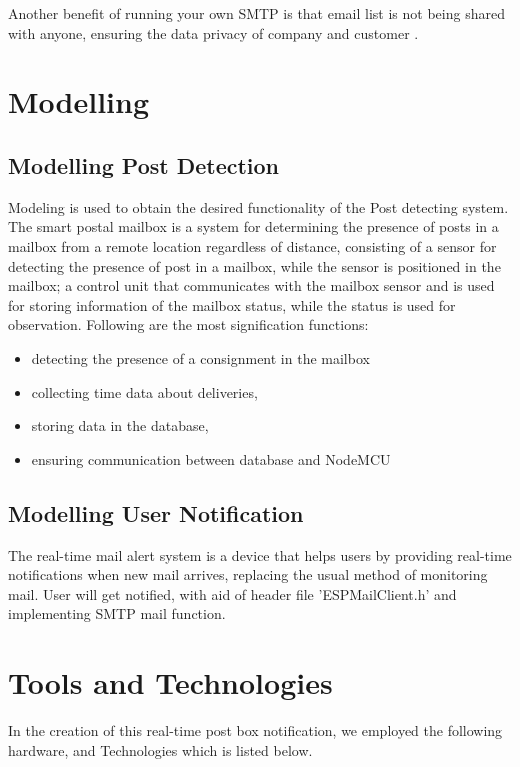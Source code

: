 Another benefit of running your own SMTP is that email list is not being shared with anyone, ensuring the data privacy of company and customer \cite{Bettina2022}.

\section{Modelling}
\subsection{Modelling Post Detection}
Modeling is used to obtain the desired functionality of the Post detecting system. The smart postal mailbox is a system for determining the presence of posts in a mailbox from a remote location regardless of distance, consisting of a sensor for detecting the presence of post in a mailbox, while the sensor is positioned in the mailbox; a control unit that communicates with the mailbox sensor and is used for storing information of the mailbox status, while the status is used for observation. Following are the most signification functions:
\begin{itemize}
    \item detecting the presence of a consignment in the mailbox
    \item collecting time data about deliveries,
    \item storing data in the database,
    \item ensuring communication between database and NodeMCU
\end{itemize}

\subsection{Modelling User Notification}
The real-time mail alert system is a device that helps users by providing real-time notifications when new mail arrives, replacing the usual method of monitoring mail. User will get notified, with aid of header file 'ESP\textunderscore Mail\textunderscore Client.h' and implementing SMTP mail function.

\section{Tools and Technologies}
In the creation of this real-time post box notification, we employed the following hardware, and Technologies which is listed below.

